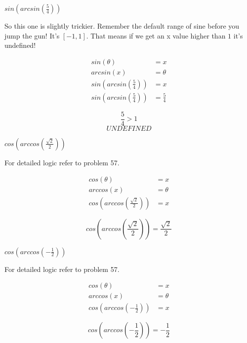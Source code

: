 \documentclass[10pt,letterpaper]{amspset}
\begin{document}
\begin{problem}[61]
    $sin \left(arcsin \left( \frac{5}{4} \right)\right)$
\end{problem}

\begin{solution}
    So this one is slightly trickier. Remember the default range of sine before you jump the gun! It's $[-1, 1]$. That means if we get an x value higher than $1$ it's undefined! 
    
    \begin{align}
        sin(\theta) &= x \\
        arcsin(x) &= \theta \\
        sin \left(arcsin \left( \frac{5}{4} \right)\right) &= x \\
        sin \left(arcsin \left( \frac{5}{4} \right)\right) &= \frac{5}{4}
    \end{align}
    
    \[ \frac{5}{4} > 1 \]
    \[\boxed{UNDEFINED}\]
\end{solution}


\pagebreak


\begin{problem}[62]
    $cos \left(arccos \left( \frac{\sqrt{2}}{2} \right)\right)$
\end{problem}

\begin{solution}
    For detailed logic refer to problem 57. 
    
    \begin{align}
        cos(\theta) &= x \\
        arccos(x) &= \theta \\
        cos \left(arccos \left( \frac{\sqrt{2}}{2} \right)\right) &= x 
    \end{align}
    
    \[\boxed{ cos \left(arccos \left( \frac{\sqrt{2}}{2} \right)\right) = \frac{\sqrt{2}}{2} } \]
\end{solution}


\begin{problem}[63]
    $cos \left(arccos \left( -\frac{1}{2} \right)\right)$
\end{problem}

\begin{solution}
    For detailed logic refer to problem 57. 
    
    \begin{align}
        cos(\theta) &= x \\
        arccos(x) &= \theta \\
        cos \left(arccos \left( -\frac{1}{2} \right)\right) &= x 
    \end{align}
    
    \[\boxed{ cos \left(arccos \left( -\frac{1}{2} \right)\right) = -\frac{1}{2} } \]
\end{solution}
\end{document}

